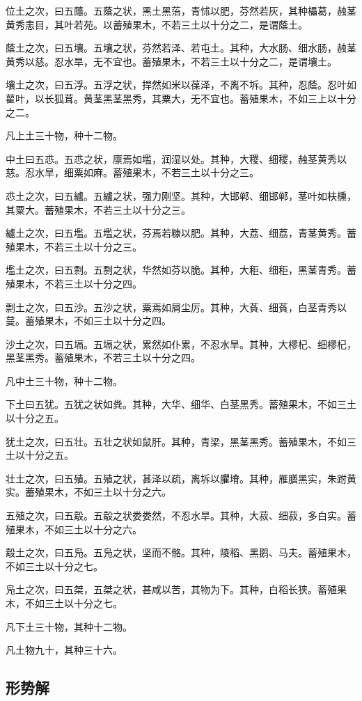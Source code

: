 \documentclass[]{article}
\begin{document}
位土之次，曰五蘟。五蔭之状，黑土黑菭，青怵以肥，芬然若灰，其种櫑葛，赨茎黄秀恚目，其叶若苑。以蓄殖果木，不若三土以十分之二，是谓蔭土。

蔭土之次，曰五壤。五壤之状，芬然若泽、若屯土。其种，大水肠、细水肠，赨茎黄秀以慈。忍水旱，无不宜也。蓄殖果木，不若三土以十分之二，是谓壤土。

壤土之次，曰五浮。五浮之状，捍然如米以葆泽，不离不坼。其种，忍蔭。忍叶如雚叶，以长狐茸。黄茎黑茎黑秀，其粟大，无不宜也。蓄殖果木，不如三上以十分之二。

凡上土三十物，种十二物。

中土曰五怷。五怷之状，廪焉如壏，润湿以处。其种，大稷、细稷，赨茎黄秀以慈。忍水旱，细粟如麻。蓄殖果木，不若三土以十分之三。

怷土之次，曰五纑。五纑之状，强力刚坚。其种，大邯郸、细邯郸，茎叶如枎櫄，其粟大。蓄殖果木，不若三土以十分之三。

纑土之次，曰五壏。五壏之状，芬焉若糠以肥。其种，大荔、细荔，青茎黄秀。蓄殖果木，不若三土以十分之三。

壏土之次，曰五剽。五剽之状，华然如芬以脆。其种，大秬、细秬，黑茎青秀。蓄殖果木，不若三土以十分之四。

剽土之次，曰五沙。五沙之状，粟焉如屑尘厉。其种，大萯、细萯，白茎青秀以蔓。蓄殖果木，不如三土以十分之四。

沙土之次，曰五塥。五塥之状，累然如仆累，不忍水旱。其种，大樛杞、细樛杞，黑茎黑秀。蓄殖果木，不若三土以十分之四。

凡中土三十物，种十二物。

下土曰五犹。五犹之状如粪。其种，大华、细华、白茎黑秀。蓄殖果木，不如三土以十分之五。

犹土之次，曰五壮。五壮之状如鼠肝。其种，青梁，黑茎黑秀。蓄殖果木，不如三土以十分之五。

壮土之次，曰五殖。五殖之状，甚泽以疏，离坼以臞塉。其种，雁膳黑实，朱跗黄实。蓄殖果木，不如三土以十分之六。

五殖之次，曰五觳。五觳之状娄娄然，不忍水旱。其种，大菽、细菽，多白实。蓄殖果木，不如三土以十分之六。

觳土之次，曰五凫。五凫之状，坚而不骼。其种，陵稻、黑鹅、马夫。蓄殖果木，不如三土以十分之七。

凫土之次，曰五桀，五桀之状，甚咸以苦，其物为下。其种，白稻长狭。蓄殖果木，不如三土以十分之七。

凡下土三十物，其种十二物。

凡土物九十，其种三十六。

\hypertarget{header-n779}{%
\subsection{形势解}\label{header-n779}}
\end{document}
